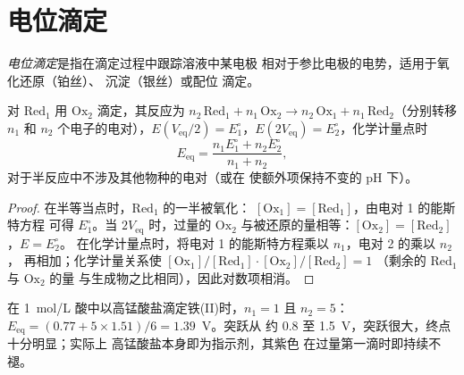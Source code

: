 \section{电位滴定}

\begin{definition}[电位滴定]\label{def:b1:titration-methods:potentiometric}
\emph{电位滴定}是指在滴定过程中跟踪溶液中某电极
相对于参比电极的电势，适用于氧化还原（铂丝）、
沉淀（银丝）或配位
滴定。
\end{definition}

\begin{proposition}[氧化还原滴定的特征点]\label{prop:b1:titration-methods:potentiometric-points}
对 $\mathrm{Red_1}$ 用 $\mathrm{Ox_2}$ 滴定，其反应为
$n_2\,\mathrm{Red_1} + n_1\,\mathrm{Ox_2} \to n_2\,\mathrm{Ox_1} +
n_1\,\mathrm{Red_2}$（分别转移 $n_1$ 和 $n_2$ 个电子的电对），$E(V_{\mathrm{eq}}/2) = E^\circ_1$，$E(2V_{\mathrm{eq}}) =
E^\circ_2$，化学计量点时
\[
  E_{\mathrm{eq}} = \frac{n_1E^\circ_1 + n_2E^\circ_2}{n_1 + n_2},
\]
对于半反应中不涉及其他物种的电对（或在
使额外项保持不变的 pH 下）。
\end{proposition}

\begin{proof}
在半等当点时，$\mathrm{Red_1}$ 的一半被氧化：
$[\mathrm{Ox_1}] = [\mathrm{Red_1}]$，由电对 1 的能斯特方程
可得 $E^\circ_1$。当 $2V_{\mathrm{eq}}$ 时，过量的 $\mathrm{Ox_2}$
与被还原的量相等：$[\mathrm{Ox_2}] = [\mathrm{Red_2}]$，$E = E^\circ_2$。
在化学计量点时，将电对 1 的能斯特方程乘以 $n_1$，电对 2 的乘以 $n_2$，
再相加；化学计量关系使
$[\mathrm{Ox_1}]/[\mathrm{Red_1}] \cdot [\mathrm{Ox_2}]/[\mathrm{Red_2}] = 1$
（剩余的 $\mathrm{Red_1}$ 与 $\mathrm{Ox_2}$ 的量
与生成物之比相同），因此对数项相消。
\end{proof}

在 \qty{1}{mol/L} 酸中以高锰酸盐滴定铁(II)时，$n_1 = 1$ 且 $n_2 =
5$：$E_{\mathrm{eq}} = (0.77 + 5 \times 1.51)/6 = 1.39$~V。突跃从
约 0.8 至 1.5~V，突跃很大，终点十分明显；实际上
高锰酸盐本身即为指示剂，其紫色
在过量第一滴时即持续不褪。

